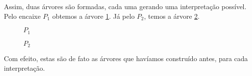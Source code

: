 Assim, duas árvores são formadas, cada uma gerando uma interpretação possível. Pelo encaixe $P_1$ obtemos a árvore \ref{tree:p1}. Já pelo $P_2$, temos a árvore \ref{tree:p2}.

\begin{figure}[h]
\begin{center}
\end{center}
\caption{$P_1$}
\label{tree:p1}
\end{figure}

\begin{figure}[h]
\begin{center}
\end{center}
\caption{$P_2$}
\label{tree:p2}
\end{figure}

Com efeito, estas são de fato as árvores que havíamos construído antes, para cada interpretação.


